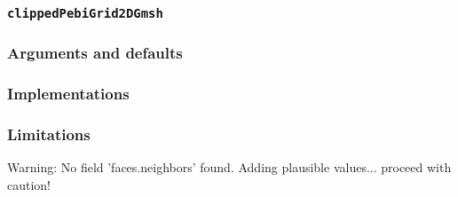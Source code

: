 \subsubsection{\texttt{clippedPebiGrid2DGmsh}}

\subsubsection{Arguments and defaults}

\subsubsection{Implementations}

\subsubsection{Limitations}

\begin{codeError}
Warning: No field 'faces.neighbors' found. Adding plausible values... proceed with caution! 
\end{codeError}
